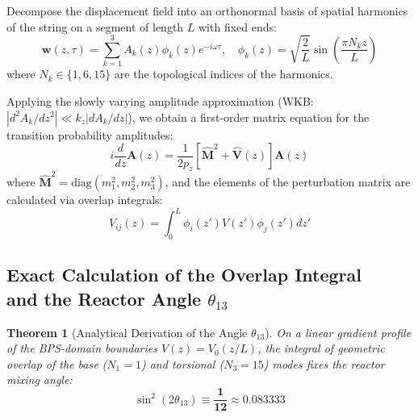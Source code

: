 \documentclass[12pt,a4paper]{article}
\newtheorem{theorem}{Theorem}
\begin{document}
		Decompose the displacement field into an orthonormal basis of spatial harmonics of the string on a segment of length $L$ with fixed ends:
		\begin{equation}
			\mathbf{w}(z, \tau) = \sum_{k=1}^3 A_k(z) \phi_k(z) e^{-i\omega \tau}, \quad \phi_k(z) = \sqrt{\frac{2}{L}} \sin\left( \frac{\pi N_k z}{L} \right)
		\end{equation}
		where $N_k \in \{1, 6, 15\}$ are the topological indices of the harmonics.
		
		Applying the slowly varying amplitude approximation (WKB: $|d^2 A_k / dz^2| \ll k_z |dA_k/dz|$), we obtain a first-order matrix equation for the transition probability amplitudes:
		\begin{equation}
			i \frac{d}{dz} \mathbf{A}(z) = \frac{1}{2 p_z} \left[ \hat{\mathbf{M}}^2 + \hat{\mathbf{V}}(z) \right] \mathbf{A}(z)
		\end{equation}
		where $\hat{\mathbf{M}}^2 = \text{diag}(m_1^2, m_2^2, m_3^2)$, and the elements of the perturbation matrix are calculated via overlap integrals:
		\begin{equation}
			V_{ij}(z) = \int_0^L \phi_i(z') V(z') \phi_j(z') dz'
		\end{equation}
		
		\subsection{Exact Calculation of the Overlap Integral\\ and the Reactor Angle $\theta_{13}$}
		\begin{theorem}[Analytical Derivation of the Angle $\theta_{13}$]
			On a linear gradient profile of the BPS-domain boundaries $V(z) = V_0 (z/L)$, the integral of geometric overlap of the base ($N_1 = 1$) and torsional ($N_3 = 15$) modes fixes the reactor mixing angle:
			\begin{equation}
				\sin^2(2\theta_{13}) \equiv \mathbf{\frac{1}{12}} \approx 0.083333
			\end{equation}
		\end{theorem}
		
\end{document}
